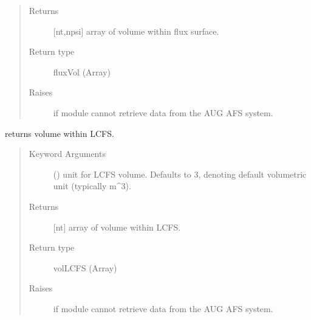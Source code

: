 \documentclass[letterpaper,10pt,english]{sphinxmanual}
\begin{document}
\begin{fulllineitems}
\begin{fulllineitems}
\begin{quote}
\begin{description}
\item[{Returns}] \leavevmode
{[}nt,npsi{]} array of volume within flux surface.

\item[{Return type}] \leavevmode
fluxVol (Array)

\item[{Raises}] \leavevmode
{} \textendash{} if module cannot retrieve data from the AUG AFS system.

\end{description}\end{quote}

\end{fulllineitems}


\begin{fulllineitems}
\label{\detokenize{eqtools:eqtools.AUGData.AUGDDData.getVolLCFS}}
returns volume within LCFS.
\begin{quote}\begin{description}
\item[{Keyword Arguments}] \leavevmode
{} () \textendash{} unit for LCFS volume.  Defaults to 3,
denoting default volumetric unit (typically m\textasciicircum{}3).

\item[{Returns}] \leavevmode
{[}nt{]} array of volume within LCFS.

\item[{Return type}] \leavevmode
volLCFS (Array)

\item[{Raises}] \leavevmode
{} \textendash{} if module cannot retrieve data from the AUG AFS system.

\end{description}\end{quote}

\end{fulllineitems}



\end{fulllineitems}
\end{document}
